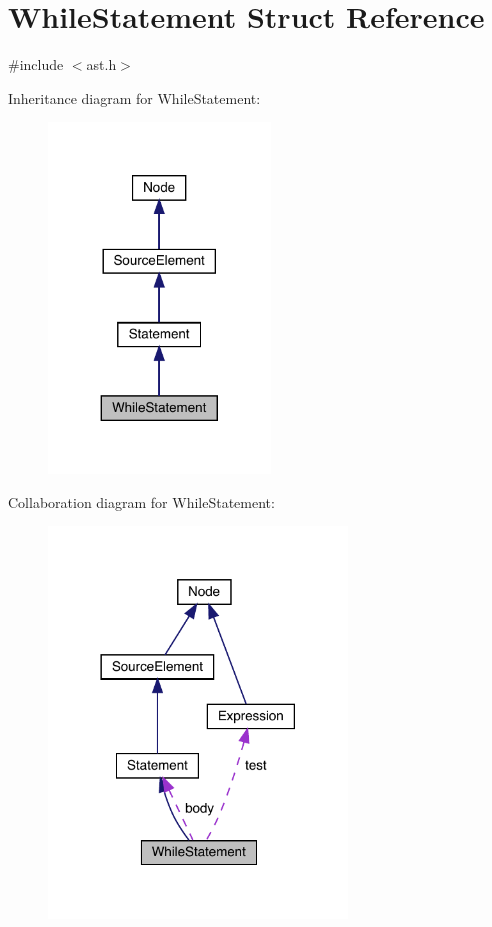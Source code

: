 \hypertarget{struct_while_statement}{}\section{While\+Statement Struct Reference}
\label{struct_while_statement}


{\ttfamily \#include $<$ast.\+h$>$}



Inheritance diagram for While\+Statement\+:
\nopagebreak
\begin{figure}[H]
\begin{center}
\leavevmode
\includegraphics[width=167pt]{struct_while_statement__inherit__graph}
\end{center}
\end{figure}


Collaboration diagram for While\+Statement\+:
\nopagebreak
\begin{figure}[H]
\begin{center}
\leavevmode
\includegraphics[width=225pt]{struct_while_statement__coll__graph}
\end{center}
\end{figure}
